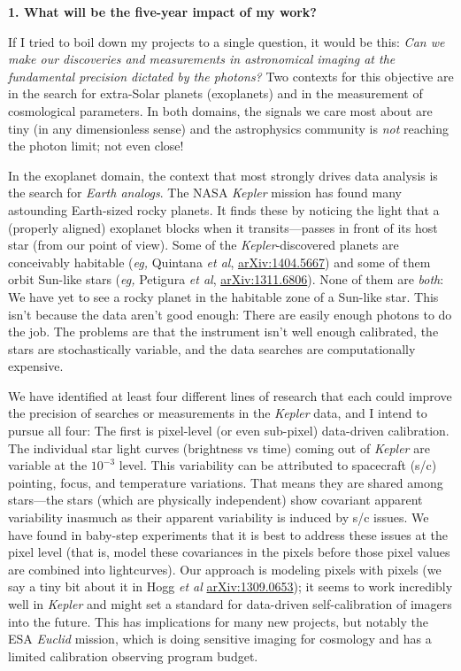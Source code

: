 \documentclass[11pt, letterpaper]{article}
\newcommand{\arxiv}[1]{\href{http://arxiv.org/abs/#1}{arXiv:#1}}
\begin{document}
\sloppy\sloppypar

\noindent\textbf{1. What will be the five-year impact of my work?}
\smallskip

If I tried to boil down my projects to a single question, it would be
this:
\emph{Can we make our discoveries and measurements in astronomical imaging
at the fundamental precision dictated by the photons?}
Two contexts for this objective are in the search for extra-Solar planets
(exoplanets) and in the measurement of cosmological parameters.
In both domains, the signals we care most about are tiny (in any
dimensionless sense) and the astrophysics community is \emph{not}
reaching the photon limit; not even close!

In the exoplanet domain, the context that most strongly drives data
analysis is the search for \emph{Earth analogs}.
The NASA \textsl{Kepler} mission has
found many astounding Earth-sized rocky planets.
It finds these by noticing the light that a
(properly aligned) exoplanet blocks when it transits---passes in front
of its host star (from our point of view).
Some of the \textsl{Kepler}-discovered planets are conceivably habitable
(\textit{eg,} Quintana \textit{et al}, \arxiv{1404.5667})
and some of them orbit Sun-like stars
(\textit{eg,} Petigura \textit{et al}, \arxiv{1311.6806}).
None of them are \emph{both}: We have yet to see a rocky planet in the
habitable zone of a Sun-like star.
This isn't because the data aren't good enough:
There are easily enough photons to do the job.
The problems are that the instrument isn't well enough calibrated, the
stars are stochastically variable, and the data searches are
computationally expensive.

We have identified at least four different lines of research that each
could improve the precision of searches or measurements in the
\textsl{Kepler} data, and I intend to pursue all four:
The first is pixel-level (or even sub-pixel) data-driven calibration.
The individual star light curves (brightness vs time) coming out of
\textsl{Kepler} are variable at the $10^{-3}$ level.
This variability can be attributed to spacecraft (s/c) pointing,
focus, and temperature variations.
That means they are shared among stars---the stars (which are
physically independent) show covariant apparent variability inasmuch as their
apparent variability is induced by s/c issues.
We have found in baby-step experiments that it is best to address
these issues at the pixel level (that is, model these covariances in
the pixels before those pixel values are combined into lightcurves).
Our approach is modeling pixels with pixels
(we say a tiny bit about it in Hogg \textit{et al} \arxiv{1309.0653});
it seems to work
incredibly well in \textsl{Kepler} and might set a standard for
data-driven self-calibration of imagers into the future.
This has implications for many new projects, but notably the ESA
\textsl{Euclid} mission, which is doing sensitive imaging for
cosmology and has a limited calibration observing program budget.
\end{document}
